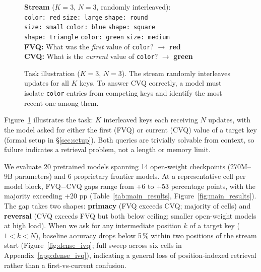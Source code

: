 \documentclass[11pt]{article}
\begin{document}
\begin{figure}[t]
\small
\centering
\begin{tcolorbox}[
    colframe=black!30, colback=white,
    boxrule=0.6pt, arc=2pt,
    left=6pt, right=6pt, top=4pt, bottom=4pt]
\textbf{Stream} ($K{=}3$, $N{=}3$, randomly interleaved):\\[4pt]
\texttt{color: red} \quad \texttt{size: large} \quad \texttt{shape: round}\\
\texttt{size: small} \quad \texttt{color: blue} \quad \texttt{shape: square}\\
\texttt{shape: triangle} \quad \texttt{color: green} \quad \texttt{size: medium}\\[6pt]
\textbf{FVQ:} What was the \textit{first} value of \texttt{color}? $\rightarrow$ \textbf{red}\\
\textbf{CVQ:} What is the \textit{current} value of \texttt{color}? $\rightarrow$ \textbf{green}
\end{tcolorbox}
\caption{Task illustration ($K{=}3$, $N{=}3$). The stream randomly
interleaves updates for all $K$ keys. To answer CVQ correctly, a
model must isolate \texttt{color} entries from competing keys and
identify the most recent one among them.}
\label{fig:task}
\end{figure}

Figure~\ref{fig:task} illustrates the task: $K$ interleaved keys
each receiving $N$ updates, with the model asked for either the
first (FVQ) or current (CVQ) value of a target key (formal setup in
\S\ref{sec:setup}). Both queries are trivially solvable from
context, so failure indicates a retrieval problem, not a length or
memory limit.

We evaluate 20 pretrained models spanning 14 open-weight checkpoints
(270M--9B parameters) and 6 proprietary frontier models.
At a representative cell per model block, FVQ$-$CVQ gaps range from
+6 to +53 percentage points, with the majority exceeding +20 pp
(Table~\ref{tab:main_results}, Figure~\ref{fig:main_results}).
The gap takes two shapes: \textbf{primacy} (FVQ exceeds CVQ;
majority of cells) and \textbf{reversal} (CVQ exceeds FVQ but both
below ceiling; smaller open-weight models at high load).
When we ask for any intermediate position $k$ of a target key
($1 < k < N$), baseline accuracy drops below 5\,\% within two
positions of the stream start
(Figure~\ref{fig:dense_ivq}; full sweep across six cells in
Appendix~\ref{app:dense_ivq}), indicating a general loss of
position-indexed retrieval rather than a first-vs-current confusion.
\end{document}
